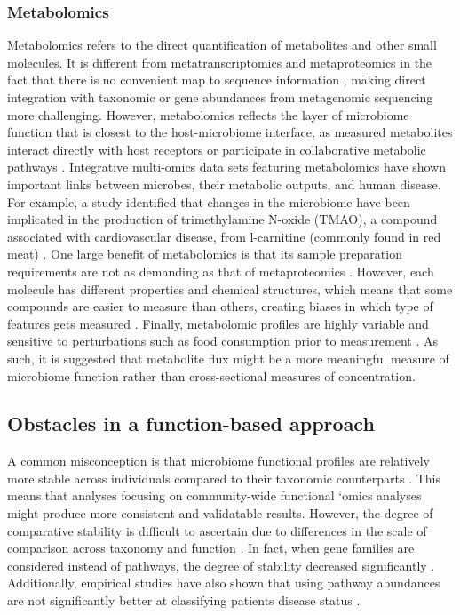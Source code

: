 \subsubsection{Metabolomics}
Metabolomics refers to the direct quantification of metabolites and other small molecules. It is different from  metatranscriptomics and metaproteomics in the fact that there is no convenient map to sequence information \cite{franzosa2015sequencing}, making direct integration with taxonomic or gene abundances from metagenomic sequencing more challenging. However, metabolomics reflects the layer of microbiome function that is closest to the host-microbiome interface, as measured metabolites interact directly with host receptors or participate in collaborative metabolic pathways \cite{tang2011microbial}. Integrative multi-omics data sets featuring metabolomics have shown important links between microbes, their metabolic outputs, and human disease. For example, a study identified that changes in the microbiome have been implicated in the production of trimethylamine N-oxide (TMAO), a compound associated with cardiovascular disease, from l-carnitine (commonly found in red meat) \cite{wang2011gut}. One large benefit of metabolomics is that its sample preparation requirements are not as demanding as that of metaproteomics \cite{franzosa2019gut, verberkmoes2009shotgun}. However, each molecule has different properties and chemical structures, which means that some compounds are easier to measure than others, creating biases in which type of features gets measured \cite{tang2011microbial}. Finally, metabolomic profiles are highly variable and sensitive to perturbations such as food consumption prior to measurement \cite{hollywood2006metabolomics}. As such, it is suggested that metabolite flux might be a more meaningful measure of microbiome function rather than cross-sectional measures of concentration.  


\subsection{Obstacles in a function-based approach} 

A common misconception is that microbiome functional profiles are relatively more stable across individuals compared to their taxonomic counterparts \cite{consortium2012structure}. This means that analyses focusing on community-wide functional `omics analyses might produce more consistent and validatable results. However, the degree of comparative stability is difficult to ascertain due to differences in the scale of comparison across taxonomy and function \cite{langille2018exploring}. In fact, when gene families are considered instead of pathways, the degree of stability decreased significantly \cite{inkpen2017coupling}. Additionally, empirical studies have also shown that using pathway abundances are not significantly better at classifying patients disease status \cite{xu2014which}.   

